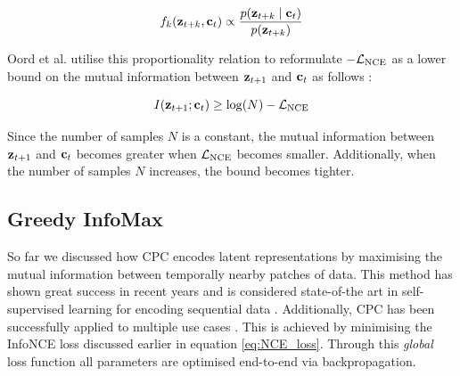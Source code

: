 	\begin{equation}
		f_k(\mathbf{z}_{t+k}, \mathbf{c}_t) \propto \frac{p(\mathbf{z}_{t+k} \mid \mathbf{c}_t)}{p(\mathbf{z}_{t+k})} \label{eq:fkproporational}
	\end{equation}
	
	Oord et al. utilise this proportionality relation to reformulate $-\mathcal{L}_{\text{NCE}}$ as a lower bound on the mutual information between $\mathbf{z}_{t+1}$ and $\mathbf{c}_t$ as follows \cite{lowePuttingEndEndtoEnd2020, oordRepresentationLearningContrastive2019}:
	
	\begin{equation}
		I(\mathbf{z}_{t+1}; \mathbf{c}_t) \ge \log(N) - \mathcal{L}_{\text{NCE}}
	\end{equation}

	Since the number of samples $N$ is a constant, the mutual information between $\mathbf{z}_{t+1}$ and $\mathbf{c}_t$ becomes greater when $\mathcal{L}_{\text{NCE}}$ becomes smaller. Additionally, when the number of samples $N$ increases, the bound becomes tighter.
	
			
	
	

\subsection{Greedy InfoMax}
	So far we discussed how CPC encodes latent representations by maximising the mutual information between temporally nearby patches of data. This method has shown great success in recent years and is considered state-of-the art in self-supervised learning for encoding sequential data \cite{stackeEvaluationContrastivePredictive2020}. Additionally, CPC has been successfully applied to multiple use cases \cite{stackeEvaluationContrastivePredictive2020, dehaanContrastivePredictiveCoding2021, luSemiSupervisedHistologyClassification2019, bhatiSegmentalContrastivePredictive2021b, deldariTimeSeriesChange2021, henaffDataEfficientImageRecognition2020}. This is achieved by minimising the InfoNCE loss discussed earlier in equation \ref{eq:NCE_loss}. Through this \textit{global} loss function all parameters are optimised end-to-end via backpropagation. 
	

